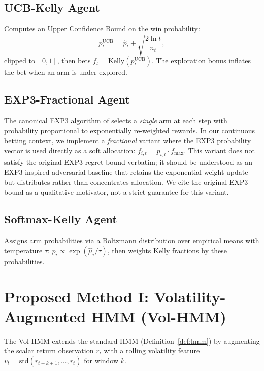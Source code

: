 \subsection{UCB-Kelly Agent}

Computes an Upper Confidence Bound on the win probability:
\[
    p_t^{\text{UCB}} = \hat{p}_t + \sqrt{\frac{2\ln t}{n_t}},
\]
clipped to $[0,1]$, then bets $f_t = \text{Kelly}(p_t^{\text{UCB}})$.
The exploration bonus inflates the bet when an arm is under-explored.

\subsection{EXP3-Fractional Agent}

\begin{remark}
\label{rem:exp3}
    The canonical EXP3 algorithm of \textcite{auer2002nonstochastic} selects
    a \emph{single} arm at each step with probability proportional to
    exponentially re-weighted rewards. In our continuous betting context,
    we implement a \emph{fractional} variant where the EXP3 probability
    vector is used directly as a soft allocation: $f_{i,t} = p_{i,t}
    \cdot f_{\max}$. This variant does not satisfy the original EXP3 regret
    bound verbatim; it should be understood as an EXP3-inspired adversarial
    baseline that retains the exponential weight update but distributes
    rather than concentrates allocation. We cite the original EXP3 bound
    as a qualitative motivator, not a strict guarantee for this variant.
\end{remark}

\subsection{Softmax-Kelly Agent}

Assigns arm probabilities via a Boltzmann distribution over empirical
means with temperature $\tau$: $p_i \propto \exp(\hat{\mu}_i / \tau)$,
then weights Kelly fractions by these probabilities.

\section{Proposed Method I: Volatility-Augmented HMM (Vol-HMM)}
\label{sec:vol-hmm}

The Vol-HMM extends the standard HMM (Definition~\ref{def:hmm}) by
augmenting the scalar return observation $r_t$ with a rolling volatility
feature $v_t = \text{std}(r_{t-k+1}, \ldots, r_t)$ for window $k$.

